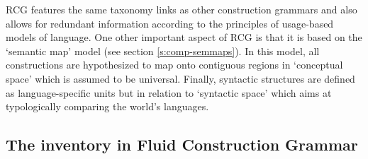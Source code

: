 RCG features the same taxonomy links as other construction grammars and also allows for redundant information according to the principles of usage-based models of language. One other important aspect of RCG is that it is based on the `semantic map' model (see section \ref{s:comp-semmaps}). In this model, all constructions are hypothesized to map onto contiguous regions in `conceptual space' which is assumed to be universal. Finally, syntactic structures are defined as language-specific units but in relation to `syntactic space' which aims at typologically comparing the world's languages.

\subsection{The inventory in Fluid Construction Grammar}

